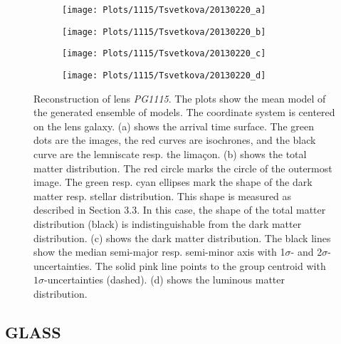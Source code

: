 \documentclass[10pt]{article}
\begin{document}
\begin{figure}[ht!]
 \centering
 \begin{subfigure}{.48\textwidth}
  \centering
  \texttt{[image: Plots/1115/Tsvetkova/20130220\_a]}
  \caption{}
  \label{fig:exampleplots1}
 \end{subfigure}
 \begin{subfigure}{.48\textwidth}
  \centering
  \texttt{[image: Plots/1115/Tsvetkova/20130220\_b]}
  \caption{}
  \label{fig:exampleplots2}
 \end{subfigure}
 
 \begin{subfigure}{.48\textwidth}
  \centering
  \texttt{[image: Plots/1115/Tsvetkova/20130220\_c]}
  \caption{}
  \label{fig:exampleplots3}
 \end{subfigure}
 \begin{subfigure}{.48\textwidth}
  \centering
  \texttt{[image: Plots/1115/Tsvetkova/20130220\_d]}
  \caption{}
  \label{fig:exampleplots4}
 \end{subfigure}
 \captionsetup{width=.93\textwidth}
 \caption{Reconstruction of lens \textit{PG1115}. The plots show the mean model of the generated ensemble of models. The coordinate system is centered on the lens galaxy. (a) shows the arrival time surface. The green dots are the images, the red curves are isochrones, and the black curve are the lemniscate resp. the lima\c{c}on. (b) shows the total matter distribution. The red circle marks the circle of the outermost image. The green resp. cyan ellipses mark the shape of the dark matter resp. stellar distribution. This shape is measured as described in Section 3.3. In this case, the shape of the total matter distribution (black) is indistinguishable from the dark matter distribution. (c) shows the dark matter distribution. The black lines show the median semi-major resp. semi-minor axis with 1$\sigma$- and 2$\sigma$- uncertainties. The solid pink line points to the group centroid with $1\sigma$-uncertainties (dashed). (d) shows the luminous matter distribution.}
 \label{fig:exampleplots}
\end{figure}

\subsection{GLASS}
\end{document}
